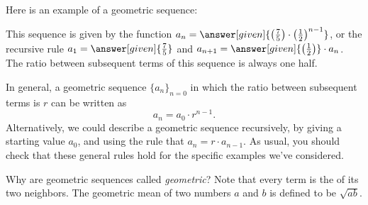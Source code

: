 \documentclass{ximera}
\begin{document}
\begin{example}
  Here is an example of a geometric sequence:
  \begin{image}
  \end{image}
  This sequence is given by the function $a_n=\answer[given]{\left(\frac{7}{5}\right)\cdot
    \left(\frac{1}{2}\right)^{n-1}}$, or the recursive rule $a_1 = \answer[given]{\frac{7}{5}}$ and
  $a_{n+1} = \answer[given]{\left(\frac{1}{2}\right)}\cdot a_n$. The ratio between subsequent terms 
  of this sequence is always one half.
\end{example}

In general, a geometric sequence $\{a_n\}_{n=0}$ in which the ratio between
subsequent terms is $r$ can be written as
\[
a_n = a_0 \cdot r^{n-1}.
\]
Alternatively, we could describe a geometric sequence
recursively, by giving a starting value $a_0$, and using the rule that
$a_{n} = r \cdot a_{n-1}$.  As usual, you should check that these general 
rules hold for the specific examples we've considered.

\begin{remark}
Why are geometric sequences called \textit{geometric}?  Note that
every term is the  of its two neighbors.  The
geometric mean of two numbers $a$ and $b$ is defined to be
$\sqrt{ab}$.

\end{remark}
%
\end{document}
